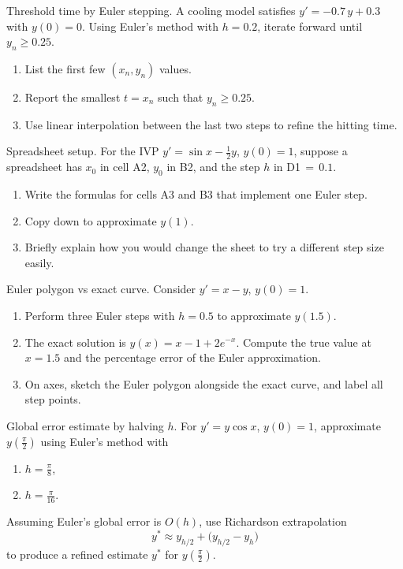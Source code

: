 \documentclass[11pt]{article}
\def\textbf#1{#1}%
\def\texttt#1{#1}%
\newcounter{question}
\begin{document}
\begin{question}
\textbf{Threshold time by Euler stepping.}
A cooling model satisfies $y'=-0.7\,y+0.3$ with $y(0)=0$.
Using Euler’s method with $h=0.2$, iterate forward until $y_n\ge 0.25$.
\begin{enumerate}
  \item List the first few $(x_n,y_n)$ values.
  \item Report the smallest $t=x_n$ such that $y_n\ge 0.25$.
  \item Use linear interpolation between the last two steps to refine the hitting time.
\end{enumerate}
\end{question}

\begin{question}
\textbf{Spreadsheet setup.}
For the IVP $y'= \sin x-\tfrac12 y$, $y(0)=1$, suppose a spreadsheet has
$x_0$ in cell \texttt{A2}, $y_0$ in \texttt{B2}, and the step $h$ in \texttt{D1}$\,{=}\,0.1$.
\begin{enumerate}
  \item Write the formulas for cells \texttt{A3} and \texttt{B3} that implement one Euler step.
  \item Copy down to approximate $y(1)$.
  \item Briefly explain how you would change the sheet to try a different step size easily.
\end{enumerate}
\end{question}

\begin{question}
\textbf{Euler polygon vs exact curve.}
Consider $y' = x-y$, $y(0)=1$.
\begin{enumerate}
  \item Perform three Euler steps with $h=0.5$ to approximate $y(1.5)$.
  \item The exact solution is $y(x)=x-1+2e^{-x}$. Compute the true value at $x=1.5$ and the percentage error of the Euler approximation.
  \item On axes, sketch the Euler polygon alongside the exact curve, and label all step points.
\end{enumerate}
\end{question}

\begin{question}
\textbf{Global error estimate by halving $h$.}
For $y' = y\cos x$, $y(0)=1$, approximate $y(\tfrac{\pi}{2})$ using Euler’s method with
\begin{enumerate}
  \item $h=\tfrac{\pi}{8}$,
  \item $h=\tfrac{\pi}{16}$.
\end{enumerate}
Assuming Euler’s global error is $O(h)$, use Richardson extrapolation
\[
y^\ast \approx y_{h/2} + \big(y_{h/2}-y_h\big)
\]
to produce a refined estimate $y^\ast$ for $y(\tfrac{\pi}{2})$.
\end{question}
\end{document}
